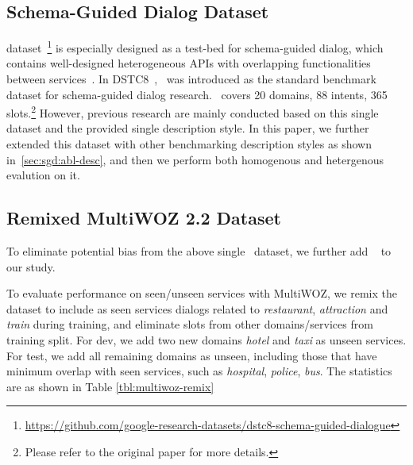 \subsection{Schema-Guided Dialog Dataset}
\label{ssec:sgd:schema-dataset}
\sgdst
dataset~\footnote{\url{https://github.com/google-research-datasets/dstc8-schema-guided-dialogue}}
is especially designed as a test-bed for schema-guided dialog, which
contains well-designed heterogeneous APIs with overlapping
functionalities between services~\cite{rastogi2019towards}. In
DSTC8~\cite{rastogi2020schema}, \sgdst~was introduced as the standard
benchmark dataset for schema-guided dialog research. \sgdst~covers 20
domains, 88 intents, 365 slots.\footnote{Please refer to the original
  paper for more details.} However, previous research are mainly
conducted based on this single dataset and the provided single
description style. In this paper, we further extended this dataset
with other benchmarking description styles as shown in~\autoref{sec:sgd:abl-desc}, and then we perform both homogenous and
hetergenous evalution on it.

\subsection{Remixed MultiWOZ 2.2 Dataset}
\label{ssec:sgd:multiwoz-dataset}

To eliminate potential bias from the above single \sgdst~dataset, we
further add \multiwoz~\cite{zang-etal-2020-multiwoz} to our study.

To evaluate performance on seen/unseen services with MultiWOZ, we
remix the \multiwoz dataset to include as seen services dialogs
related to \textit{restaurant}, \textit{attraction} and \textit{train}
during training, and eliminate slots from other domains/services from
training split.  For dev, we add two new domains {\it hotel} and {\it
  taxi} as unseen services. For test, we add all remaining domains as
unseen, including those that have minimum overlap with seen services,
such as {\it hospital}, {\it police}, {\it bus}. The statistics are as
shown in Table \ref{tbl:multiwoz-remix}


